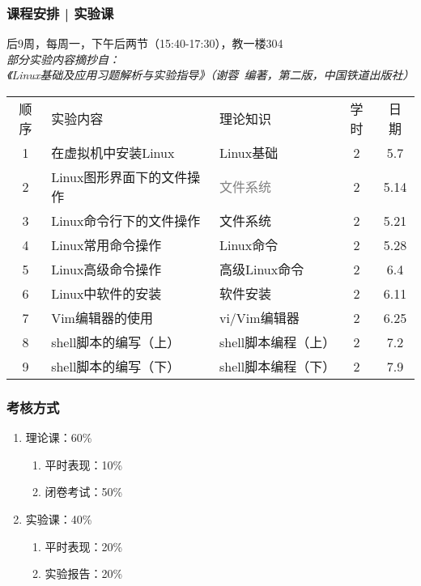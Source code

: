 \begin{frame}
  \frametitle{课程安排 | 实验课}
  \begin{center}
  \alert{后9周，每周一，下午后两节（15:40-17:30），教一楼304}\\
  \vspace{0.2cm}
  {\footnotesize
  \textit{部分实验内容摘抄自：\\ 《Linux基础及应用习题解析与实验指导》（谢蓉\ 编著，第二版，中国铁道出版社）}
  }
  \end{center}
  \vspace{-0.5cm}
  \begin{table}
    \centering
    \begin{tabular}{cllcc}
      \hline
      \rowcolor{blue!50}顺序 & 实验内容 & 理论知识 & 学时 & 日期\\
      1 & 在虚拟机中安装Linux & Linux基础 & 2 & 5.7\\
      2 & Linux图形界面下的文件操作 & \textcolor{gray}{文件系统} & 2 & 5.14\\
      3 & Linux命令行下的文件操作 & 文件系统 & 2 & 5.21\\
      4 & Linux常用命令操作 & Linux命令 & 2 & 5.28\\
      5 & Linux高级命令操作 & 高级Linux命令 & 2 & 6.4\\
      6 & Linux中软件的安装 & 软件安装 & 2 & 6.11\\
      7 & Vim编辑器的使用 & vi/Vim编辑器 & 2 & 6.25\\
      8 & shell脚本的编写（上） & shell脚本编程（上） & 2 & 7.2\\
      9 & shell脚本的编写（下） & shell脚本编程（下） & 2 & 7.9\\
      \hline
    \end{tabular}
  \end{table}
\end{frame}

\begin{frame}
  \frametitle{考核方式}
  \begin{enumerate}
    \item 理论课：60\%
      \begin{enumerate}
        \item 平时表现：10\%
        \item 闭卷考试：50\%
      \end{enumerate}
    \item 实验课：40\%
      \begin{enumerate}
        \item 平时表现：20\%
        \item 实验报告：20\%
      \end{enumerate}
  \end{enumerate}
\end{frame}

